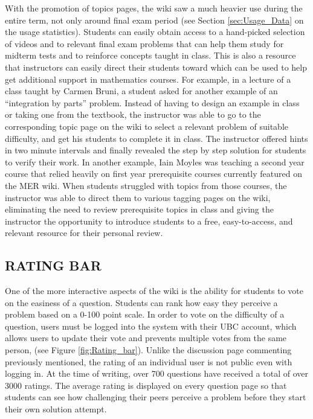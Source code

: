 \documentclass{primus}
\begin{document}
\noindent{}With the promotion of topics pages, the wiki saw a much heavier use during the entire term, not only around final exam period (see Section \ref{sec:Usage_Data} on the usage statistics). Students can easily obtain access to a hand-picked selection of videos and to relevant final exam problems that can help them study for midterm tests and to reinforce concepts taught in class. This is also a resource that instructors can easily direct their students toward which can be used to help get additional support in mathematics courses. For example, in a lecture of a class taught by Carmen Bruni, a student asked for another example of an “integration by parts” problem. Instead of having to design an example in class or taking one from the textbook, the instructor was able to go to the corresponding topic page on the wiki to select a relevant problem of suitable difficulty, and get his students to complete it in class. The instructor offered hints in two minute intervals and finally revealed the step by step solution for students to verify their work. In another example, Iain Moyles was teaching a second year course that relied heavily on first year prerequisite courses currently featured on the MER wiki. When students struggled with topics from those courses, the instructor was able to direct them to various tagging pages on the wiki, eliminating the need to review prerequisite topics in class and giving the instructor the opportunity to introduce students to a free, easy-to-access, and relevant resource for their personal review.

\subsection{RATING BAR}\label{sec:Rating_Bar}
One of the more interactive aspects of the wiki is the ability for students to vote on the easiness of a question. Students can rank how easy they perceive a problem based on a 0-100 point scale. In order to vote on the difficulty of a question, users must be logged into the system with their UBC account, which allows users to update their vote and prevents multiple votes from the same person, (see Figure \ref{fig:Rating_bar}). Unlike the discussion page commenting previously mentioned, the rating of an individual user is not public even with logging in. At the time of writing, over 700 questions have received a total of over 3000 ratings. The average rating is displayed on every question page so that students can see how challenging their peers perceive a problem before they start their own solution attempt.
\end{document}
